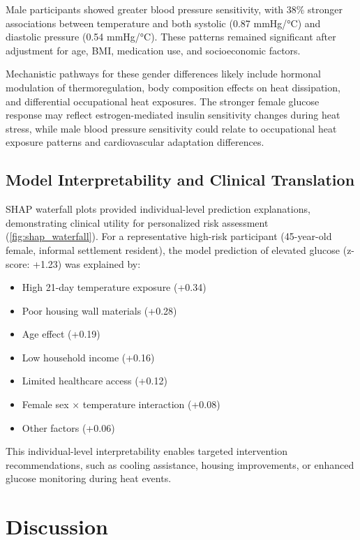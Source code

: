 \documentclass[journal,article,submit,pdftex,moreauthors]{Definitions/mdpi}
\begin{document}
Male participants showed greater blood pressure sensitivity, with 38\% stronger associations between temperature and both systolic (0.87 mmHg/°C) and diastolic pressure (0.54 mmHg/°C). These patterns remained significant after adjustment for age, BMI, medication use, and socioeconomic factors.

Mechanistic pathways for these gender differences likely include hormonal modulation of thermoregulation, body composition effects on heat dissipation, and differential occupational heat exposures. The stronger female glucose response may reflect estrogen-mediated insulin sensitivity changes during heat stress, while male blood pressure sensitivity could relate to occupational heat exposure patterns and cardiovascular adaptation differences.

\subsection{Model Interpretability and Clinical Translation}

SHAP waterfall plots provided individual-level prediction explanations, demonstrating clinical utility for personalized risk assessment (\cref{fig:shap_waterfall}). For a representative high-risk participant (45-year-old female, informal settlement resident), the model prediction of elevated glucose (z-score: +1.23) was explained by:

\begin{itemize}
\item High 21-day temperature exposure (+0.34)
\item Poor housing wall materials (+0.28)  
\item Age effect (+0.19)
\item Low household income (+0.16)
\item Limited healthcare access (+0.12)
\item Female sex × temperature interaction (+0.08)
\item Other factors (+0.06)
\end{itemize}

This individual-level interpretability enables targeted intervention recommendations, such as cooling assistance, housing improvements, or enhanced glucose monitoring during heat events.

\section{Discussion}
\end{document}
